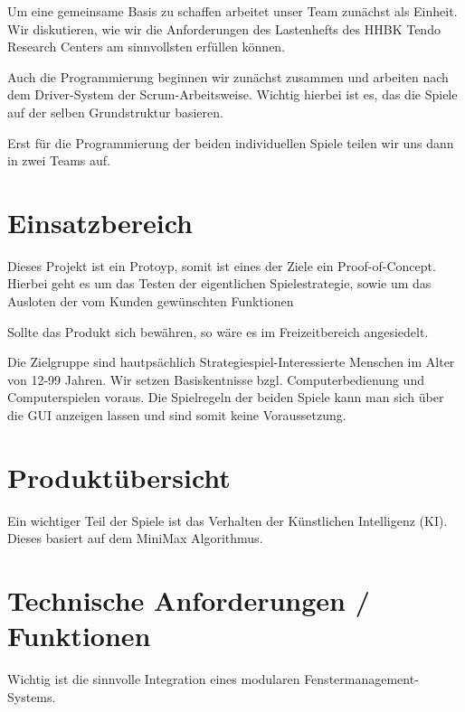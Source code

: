 \documentclass[14pt]{scrartcl}
\begin{document}
Um eine gemeinsame Basis zu schaffen arbeitet unser Team zunächst als Einheit. Wir diskutieren, wie wir die Anforderungen des Lastenhefts des HHBK Tendo Research Centers am sinnvollsten erfüllen können. \par 

Auch die Programmierung beginnen wir zunächst zusammen und arbeiten nach dem Driver-System der Scrum-Arbeitsweise. 
Wichtig hierbei ist es, das die Spiele auf der selben Grundstruktur basieren. \par

Erst für die Programmierung der beiden individuellen Spiele teilen wir uns dann in zwei Teams auf. \par 

\section{Einsatzbereich}

Dieses Projekt ist ein Protoyp, somit ist eines der Ziele ein Proof-of-Concept. Hierbei geht es um das Testen der 
eigentlichen Spielestrategie, sowie um das Ausloten der vom Kunden gewünschten Funktionen \par

Sollte das Produkt sich bewähren, so wäre es im Freizeitbereich angesiedelt. \par

Die Zielgruppe sind hautpsächlich Strategiespiel-Interessierte Menschen im Alter von 12-99 Jahren. Wir setzen Basiskentnisse
bzgl. Computerbedienung und Computerspielen voraus. Die Spielregeln der beiden Spiele kann man sich über die GUI anzeigen lassen und sind somit
keine Voraussetzung.\par


\section{Produktübersicht}


Ein wichtiger Teil der Spiele ist das Verhalten der Künstlichen Intelligenz (KI). Dieses basiert auf dem MiniMax Algorithmus.



\section{Technische Anforderungen / Funktionen}

Wichtig ist die sinnvolle Integration eines modularen Fenstermanagement-Systems. \par
\end{document}
